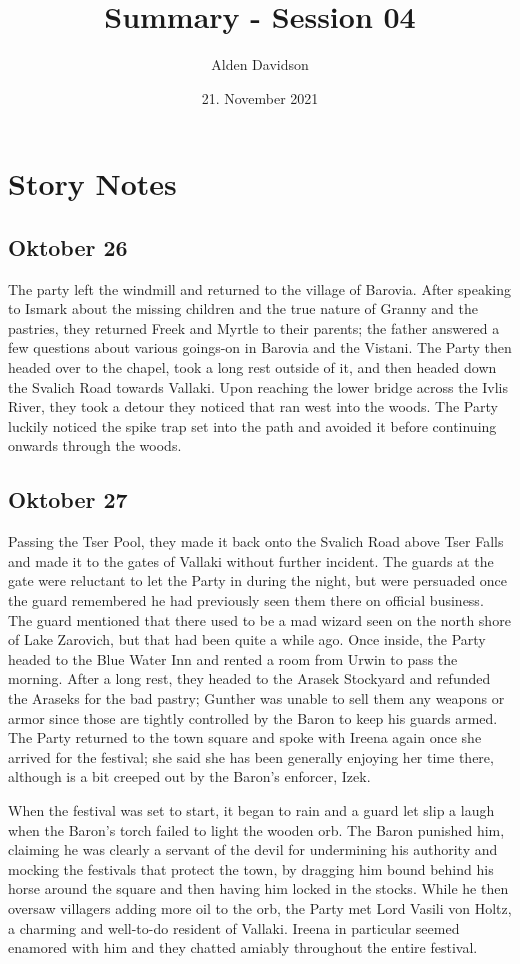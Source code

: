 \documentclass[a4paper,11pt]{article}
\title{Summary - Session 04}
\author{Alden Davidson}
\date{21. November 2021}
\begin{document}
\maketitle

\section{Story Notes}
\subsection{Oktober 26}
The party left the windmill and returned to the village of Barovia. After speaking to Ismark about the missing
children and the true nature of Granny and the pastries, they returned Freek and Myrtle to their parents; the 
father answered a few questions about various goings-on in Barovia and the Vistani. The Party then headed over to 
the chapel, took a long rest outside of it, and then headed down the Svalich Road towards Vallaki. Upon reaching 
the lower bridge across the Ivlis River, they took a detour they noticed that ran west into the woods. The Party 
luckily noticed the spike trap set into the path and avoided it before continuing onwards through the woods.

\subsection{Oktober 27}
Passing the Tser Pool, they made it back onto the Svalich Road above Tser Falls and made it to the gates of 
Vallaki without further incident. The guards at the gate were reluctant to let the Party in during the night, but 
were persuaded once the guard remembered he had previously seen them there on official business. The guard 
mentioned that there used to be a mad wizard seen on the north shore of Lake Zarovich, but that had been quite a 
while ago. Once inside, the Party headed to the Blue Water Inn and rented a room from Urwin to pass the morning. 
After a long rest, they headed to the Arasek Stockyard and refunded the Araseks for the bad pastry; Gunther was 
unable to sell them any weapons or armor since those are tightly controlled by the Baron to keep his guards 
armed. The Party returned to the town square and spoke with Ireena again once she arrived for the festival; she 
said she has been generally enjoying her time there, although is a bit creeped out by the Baron's enforcer, Izek.

When the festival was set to start, it began to rain and a guard let slip a laugh when the Baron's torch failed to
light the wooden orb. The Baron punished him, claiming he was clearly a servant of the devil for undermining his
authority and mocking the festivals that protect the town, by dragging him bound behind his horse around the 
square and then having him locked in the stocks. While he then oversaw villagers adding more oil to the orb, the 
Party met Lord Vasili von Holtz, a charming and well-to-do resident of Vallaki. Ireena in particular seemed 
enamored with him and they chatted amiably throughout the entire festival.
\end{document}
